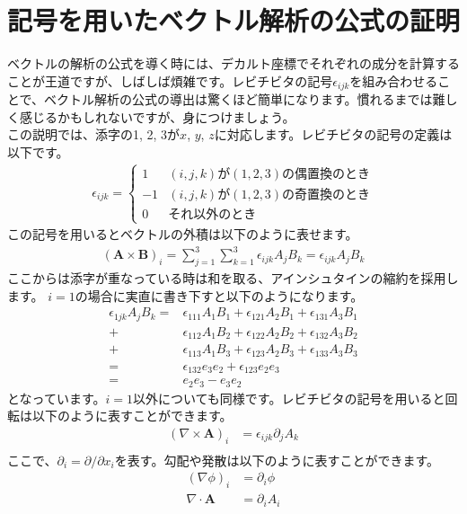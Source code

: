 \documentclass{ltjarticle}
\begin{document}
\section{記号を用いたベクトル解析の公式の証明}\label{sec:symbol_vector}
    ベクトルの解析の公式を導く時には、デカルト座標でそれぞれの成分を計算することが王道ですが、しばしば煩雑です。レビチビタの記号$\epsilon_{ijk}$を組み合わせることで、ベクトル解析の公式の導出は驚くほど簡単になります。慣れるまでは難しく感じるかもしれないですが、身につけましょう。
    \\
    この説明では、添字の1, 2, 3が$x$, $y$, $z$に対応します。レビチビタの記号の定義は以下です。
    \begin{align*}
        \epsilon_{ijk} = 
        \begin{cases}
            1  & (i,j,k)が(1,2,3)の偶置換のとき\\
            -1 & (i,j,k)が(1,2,3)の奇置換のとき\\
            0  & それ以外のとき
        \end{cases}
    \end{align*}
    この記号を用いるとベクトルの外積は以下のように表せます。
    \begin{align*}
        \left(\bm{A}\times\bm{B}\right)_i = \sum_{j=1}^3\sum_{k=1}^3 \epsilon_{ijk} A_j B_k= \epsilon_{ijk}A_jB_k
    \end{align*}
    ここからは添字が重なっている時は和を取る、アインシュタインの縮約を採用します。
    $i=1$の場合に実直に書き下すと以下のようになります。
    \begin{align*}
        \epsilon_{1jk}A_jB_k = &
        \epsilon_{111}A_1B_1 + 
        \epsilon_{121}A_2B_1 + 
        \epsilon_{131}A_3B_1 \\+ &
        \epsilon_{112}A_1B_2 + 
        \epsilon_{122}A_2B_2 + 
        \epsilon_{132}A_3B_2 \\+ &
        \epsilon_{113}A_1B_3 + 
        \epsilon_{123}A_2B_3 + 
        \epsilon_{133}A_3B_3 \\
        = &
        \epsilon_{132}e_3e_2 + 
        \epsilon_{123}e_2e_3 \\
        = & e_2e_3 - e_3e_2
    \end{align*}
    となっています。$i=1$以外についても同様です。レビチビタの記号を用いると回転は以下のように表すことができます。
    \begin{align*}
        \left(\nabla\times \bm{A}\right)_i &= \epsilon_{ijk} \partial_j A_k \\        
    \end{align*}
    ここで、$\partial_i=\partial/\partial x_i$を表す。勾配や発散は以下のように表すことができます。
    \begin{align*}
        (\nabla \phi)_i &= \partial_i \phi \\
        \nabla\cdot \bm{A} &= \partial_i A_i
    \end{align*}
\end{document}
